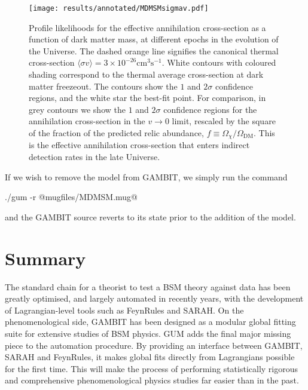 \documentclass[pdftex,twocolumn,epjc3_preprint,runningheads]{svjour3}
\renewcommand{\_}{\discretionary{\underscore}{}{\underscore}}
\newcommand{\gambit}{\textsf{GAMBIT}\xspace}
\newcommand{\GB}{\gambit}
\newcommand{\gum}{\textsf{GUM}\xspace}
\newcommand{\fr}{\textsf{FeynRules}\xspace}
\newcommand{\sarah}{\textsf{SARAH}\xspace}
\begin{document}
\begin{figure}[tbp]
  \centering
  \texttt{[image: results/annotated/MDMSM\_sigmav.pdf]}
  \vspace{-2mm}
  \caption{Profile likelihoods for the effective annihilation cross-section as a function of dark matter mass, at different epochs in the evolution of the Universe. The dashed orange line signifies the canonical thermal cross-section $\langle \sigma v \rangle = 3 \times 10^{-26} \text{cm}^3\text{s}^{-1}$. White contours with coloured shading correspond to the thermal average cross-section at dark matter freezeout.  The contours show the $1$ and $2\sigma$ confidence regions, and the white star the best-fit point.  For comparison, in grey contours we show the $1$ and $2\sigma$ confidence regions for the annihilation cross-section in the $v\to0$ limit, rescaled by the square of the fraction of the predicted relic abundance, $f\equiv\Omega_\chi/\Omega_{\mathrm{DM}}$. This is the effective annihilation cross-section that enters indirect detection rates in the late Universe.
  \label{fig::sigmav}}
\end{figure}

If we wish to remove the model from \GB, we simply run the command
%
\begin{lstterm}
./gum -r @mug\_files/MDMSM.mug@
\end{lstterm}
%
and the \GB source reverts to its state prior to the addition of the model.

\section{Summary}\label{sec:summary}

The standard chain for a theorist to test a BSM theory against data has been greatly optimised, and largely automated in recently years, with the development of Lagrangian-level tools such as \fr and \sarah. On the phenomenological side, \GB has been designed as a modular global fitting suite for extensive studies of BSM physics. \gum adds the final major missing piece to the automation procedure.  By providing an interface between \GB, \sarah and \fr, it makes global fits directly from Lagrangians possible for the first time.  This will make the process of performing statistically rigorous and comprehensive phenomenological physics studies far easier than in the past.
\end{document}
